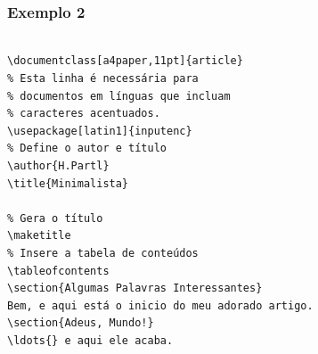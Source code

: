 \begin{frame}[fragile]
\frametitle{Exemplo 2}
\framesubtitle{}
  \scriptsize
  \begin{columns}[c]
\begin{verbatim}
\documentclass[a4paper,11pt]{article}
% Esta linha é necessária para
% documentos em línguas que incluam
% caracteres acentuados.
\usepackage[latin1]{inputenc}
% Define o autor e título
\author{H.Partl}
\title{Minimalista}

% Gera o título
\maketitle
% Insere a tabela de conteúdos
\tableofcontents
\section{Algumas Palavras Interessantes}
Bem, e aqui está o inicio do meu adorado artigo.
\section{Adeus, Mundo!}
\ldots{} e aqui ele acaba.

\end{verbatim}
  \vspace{-0.3cm}
  \begin{figure}[h!]
  \centering
  \setlength\fboxsep{0pt}
  \setlength\fboxrule{0.5pt}
  \label{fig:minimal2}
  \end{figure}
  \end{columns}
\end{frame}

